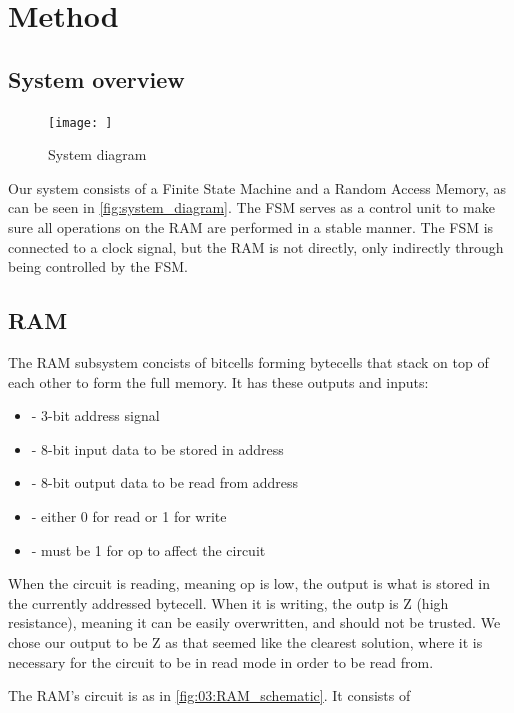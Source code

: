 \section{Method}
\subsection{System overview}

\begin{figure}
    \centering
    \texttt{[image: ]}
    \caption{System diagram}
    \label{fig:03:system_diagram}
\end{figure}

Our system consists of a Finite State Machine and a Random Access Memory, as can be seen in \autoref{fig:system_diagram}. The FSM serves as a control unit to make sure all operations on the RAM are performed in a stable manner. The FSM is connected to a clock signal, but the RAM is not directly, only indirectly through being controlled by the FSM.

\subsection{RAM}
The RAM subsystem concists of bitcells forming bytecells that stack on top of each other to form the full memory. It has these outputs and inputs:
\begin{itemize}
    \item {} - 3-bit address signal
    \item {} - 8-bit input data to be stored in address
    \item {} - 8-bit output data to be read from address
    \item {} - either 0 for read or 1 for write
    \item {} - must be 1 for op to affect the circuit
\end{itemize}
When the circuit is reading, meaning op is low, the output is what is stored in the currently addressed bytecell. When it is writing, the outp is Z (high resistance), meaning it can be easily overwritten, and should not be trusted. We chose our output to be Z as that seemed like the clearest solution, where it is necessary for the circuit to be in read mode in order to be read from.

The RAM's circuit is as in \autoref{fig:03:RAM_schematic}. It consists of 

